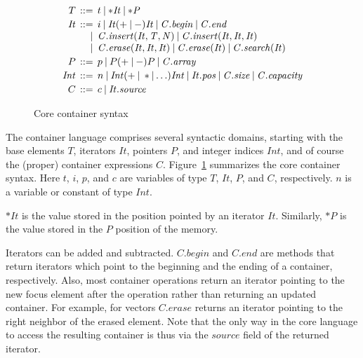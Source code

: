 \documentclass[conference]{IEEEtran}
\begin{document}
\begin{figure}
\[\begin{array}{r@{\:\:}r@{\:\:}l}
  T   & ::= &
    t \:|\: \mathit{*It} \:|\: \mathit{*P}
\\[0.5ex]
   \mathit{It} & ::= &
     i \:|\: \mathit{It} (+ \:|\: -) \mathit{It}
       \:|\: \mathit{C.begin} \:|\: \mathit{C.end}
\\  & | &
     \mathit{C.insert(It, T, N)} \:|\: \mathit{C.insert(It, It, It)}
\\  & | &
     \mathit{C.erase(It, It, It)} \:|\: \mathit{C.erase(It)} \:|\: \mathit{C.search(It)}
\\[0.5ex]
   P  & ::= &
     p \:|\: P (+ \:|\: - ) P
       \:|\: \mathit{C.array}
\\[0.5ex]
  \mathit{Int}  & ::= &
     n \:|\: \mathit{Int} (+ \:|\: * | \ldots) \mathit{Int}
       \:|\: \mathit{It.pos}
       \:|\: \mathit{C.size} \: | \: \mathit{C.capacity}
\\[0.5ex]
   C  & ::= &
     c \:|\: \mathit{It.source}
  \end{array}
\]
  \caption{\label{ccl-fig}Core container syntax}
\end{figure}

The container language comprises several syntactic domains, starting with the
base elements $\mathit{T}$, iterators $\mathit{It}$, pointers $\mathit{P}$, and
integer indices $\mathit{Int}$, and of course the (proper) container
expressions $\mathit{C}$.  Figure~\ref{ccl-fig} summarizes the core container
syntax. Here $t$, $i$, $p$, and $c$ are variables of type $T$, $\mathit{It}$,
$P$, and $C$, respectively.  $n$ is a variable or constant of type
$\mathit{Int}$.

$\mathit{*It}$ is the value stored in the position pointed
by an iterator $\mathit{It}$. Similarly, $\mathit{*P}$ is the value
stored in the $\mathit{P}$ position of the memory.

Iterators can be added and subtracted.  $\mathit{C.begin}$ and $\mathit{C.end}$
are methods that return iterators which point to the beginning and the ending
of a container, respectively.  Also, most container operations return an
iterator pointing to the new focus element after the operation rather than
returning an updated container. For example, for vectors $\mathit{C.erase}$
returns an iterator pointing to the right neighbor of the erased element.
Note that the only way in the core language to access the resulting container
is thus via the $\mathit{source}$ field of the returned iterator.
\end{document}

